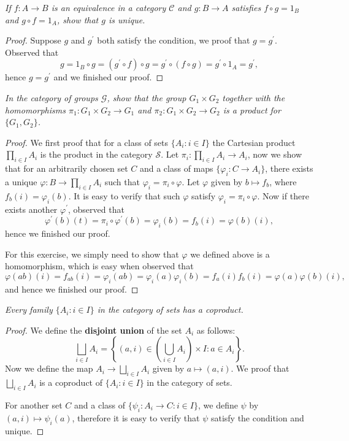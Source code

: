 \begin{problem}\em
If $f:A\to B$ is an equivalence in a category $\mathcal{C}$ and $g:B\to A$ satisfies $f\circ g=1_B$ and $g\circ f=1_A$, show that $g$ is unique.
\end{problem}
\begin{proof}
Suppose $g$ and $g^\prime$ both satisfy the condition, we proof that $g=g^\prime$. Observed that 
$$
g=1_B\circ g=\left( g^{\prime}\circ f \right) \circ g=g^{\prime}\circ \left( f\circ g \right) =g^{\prime}\circ 1_A=g^{\prime},
$$
hence $g=g^\prime$ and we finished our proof.
\end{proof}
\begin{problem}\em
In the category of groups $\mathcal{G}$, show that the group $G_1\times G_2$ together with the homomorphisms $\pi_1:G_1\times G_2\to G_1$ and $\pi_2:G_1\times G_2\to G_2$ is a product for $\{G_1,G_2\}$.
\end{problem}
\begin{proof}
We first proof that for a class of sets $\{A_i:i\in I\}$ the Cartesian product $\prod_{i\in I}A_i$ is the product in the category $\mathcal{S}$. Let $\pi_i:\prod_{i\in I}A_i\to A_i$, now we show that for an arbitrarily chosen set $C$ and a class of maps $\{\varphi_i:C\to A_i\}$, there exists a unique $\varphi:B\to\prod_{i\in I}A_i$ such that $\varphi_i=\pi_i\circ\varphi$. Let $\varphi$ given by $b\mapsto f_b$, where $f_b(i)=\varphi_i(b)$. It is easy to verify that such $\varphi$ satisfy $\varphi_i=\pi_i\circ\varphi$. Now if there exists another $\varphi^\prime$, observed that 
$$
\varphi ^{\prime}\left( b \right) \left( t \right) =\pi _i\circ \varphi ^{\prime}\left( b \right) =\varphi _i\left( b \right) =f_b\left( i \right) =\varphi \left( b \right) \left( i \right) ,
$$
hence we finished our proof.\par
For this exercise, we simply need to show that $\varphi$ we defined above is a homomorphism, which is easy when observed that 
$$
\varphi \left( ab \right) \left( i \right) =f_{ab}\left( i \right) =\varphi _i\left( ab \right) =\varphi _i\left( a \right) \varphi _i\left( b \right) =f_a\left( i \right) f_b\left( i \right) =\varphi \left( a \right) \varphi \left( b \right) \left( i \right) ,
$$
and hence we finished our proof.
\end{proof}
\begin{problem}\em
Every family $\{A_i:i\in I\}$ in the category of sets has a coproduct.
\end{problem}
\begin{proof}
We define the \textbf{disjoint union} of the set $A_i$ as follows:
$$
\bigsqcup_{i\in I}{A_i}=\left\{ \left( a,i \right) \in \left( \bigcup_{i\in I}{A_i} \right) \times I:a\in A_i \right\} .
$$
Now we define the map $A_i\to\bigsqcup_{i\in I}A_i$ given by $a\mapsto(a,i)$. We proof that $\bigsqcup_{i\in I}{A_i}$ is a coproduct of $\{A_i:i\in I\}$ in the category of sets.\par
For another set $C$ and a class of $\{\psi_i:A_i\to C:i\in I\}$, we define $\psi$ by $(a,i)\mapsto\psi_i(a)$, therefore it is easy to verify that $\psi$ satisfy the condition and unique.
\end{proof}
